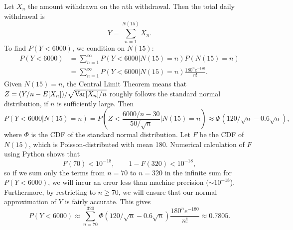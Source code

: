 \documentclass{homework}
\begin{document}
	Let $X_n$ the amount withdrawn on the $n$th withdrawal. Then the total daily withdrawal is
	\begin{equation*}
		Y = \sum_{n=1}^{N(15)} X_n.
	\end{equation*}
	To find $P(Y < 6000)$, we condition on $N(15)$:
	\begin{align*}
		P(Y < 6000) &= \sum_{n=1}^\infty P(Y < 6000 | N(15)=n) P(N(15)=n) \\
		&= \sum_{n=1}^\infty P(Y<6000 |N(15)=n) \frac{180^ne^{-180}}{n!}.
	\end{align*}
	Given $N(15)=n$, the Central Limit Theorem means that $Z = (Y/n - E[X_n]) / \sqrt{\mathrm{Var}[X_n]/n}$ roughly follows the standard normal distribution, if $n$ is sufficiently large. Then
	\begin{equation*}
		P(Y < 6000|N(15)=n) = P\left(Z <  \frac{6000/n - 30}{50/\sqrt{n}} \bigg\vert N(15)=n \right) \approx \Phi\left(120/\sqrt{n} - 0.6\sqrt{n}\right),
	\end{equation*}
	where $\Phi$ is the CDF of the standard normal distribution. Let $F$ be the CDF of $N(15)$, which is Poisson-distributed with mean 180. Numerical calculation of $F$ using Python shows that
	\begin{equation*}
		F(70) < 10^{-18}, \qquad 1-F(320) < 10^{-18},
	\end{equation*}
	so if we sum only the terms from $n=70$ to $n=320$ in the infinite sum for $P(Y<6000)$, we will incur an error less than machine precision ($\sim 10^{-18}$). Furthermore, by restricting to $n \ge 70$, we will ensure that our normal approximation of $Y$ is fairly accurate. This gives
	\begin{equation*}
		P(Y<6000) \approx \sum_{n=70}^{320} \Phi(120/\sqrt{n} - 0.6\sqrt{n})\frac{180^ne^{-180}}{n!} \approx 0.7805.
	\end{equation*}
\end{document}
